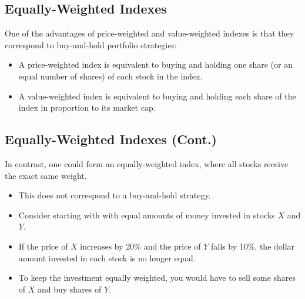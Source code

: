 \documentclass[letterpaper,10pt,english]{sphinxmanual}
\begin{document}
\subsection{Equally-Weighted Indexes}
\label{indexes:equally-weighted-indexes}
One of the advantages of price-weighted and value-weighted indexes
is that they correspond to buy-and-hold portfolio strategies:
\begin{itemize}
\item {} 
A price-weighted index is equivalent to buying and holding one share
(or an equal number of shares) of each stock in the index.

\end{itemize}
\begin{itemize}
\item {} 
A value-weighted index is equivalent to buying and holding each
share of the index in proportion to its market cap.

\end{itemize}


\subsection{Equally-Weighted Indexes (Cont.)}
\label{indexes:equally-weighted-indexes-cont}
In contrast, one could form an equally-weighted index, where all
stocks receive the exact same weight.
\begin{itemize}
\item {} 
This does not correspond to a buy-and-hold strategy.

\end{itemize}
\begin{itemize}
\item {} 
Consider starting with with equal amounts of money invested in
stocks $X$ and $Y$.

\end{itemize}
\begin{itemize}
\item {} 
If the price of $X$ increases by 20\% and the price of
$Y$ falls by 10\%, the dollar amount invested in each stock is no longer equal.

\end{itemize}
\begin{itemize}
\item {} 
To keep the investment equally weighted, you would have to sell some
shares of $X$ and buy shares of $Y$.

\end{itemize}
\end{document}
